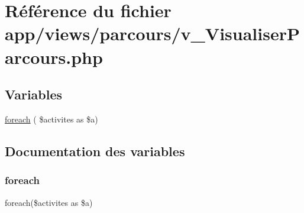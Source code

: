 \hypertarget{v___visualiser_parcours_8php}{}\section{Référence du fichier app/views/parcours/v\+\_\+\+Visualiser\+Parcours.php}
\label{v___visualiser_parcours_8php}
\subsection*{Variables}
\begin{DoxyCompactItemize}
\item 
\hyperlink{v___visualiser_parcours_8php_a8d5c35ed90476fa9969c5b05b170ec81}{foreach} ( \$activites as \$a)
\end{DoxyCompactItemize}


\subsection{Documentation des variables}
\mbox{\label{v___visualiser_parcours_8php_a8d5c35ed90476fa9969c5b05b170ec81}} 
\subsubsection{\texorpdfstring{foreach}{foreach}}
{\footnotesize\ttfamily foreach(\$activites as \$a)}

